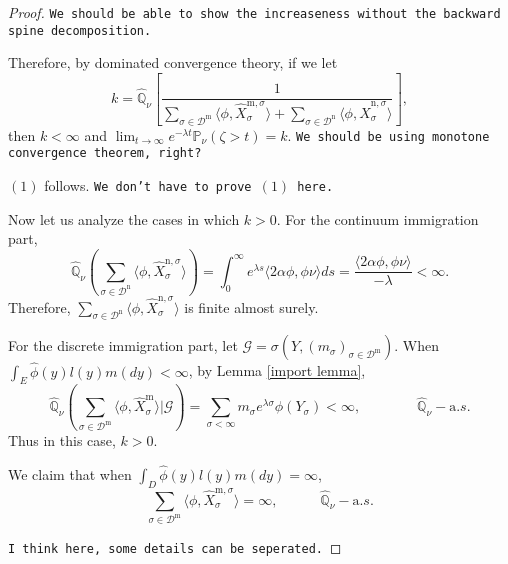 \documentclass[12pt,a4paper]{amsart}
\numberwithin{equation}{section}
\theoremstyle{plain}
\theoremstyle{definition}
\theoremstyle{remark}
\begin{document}
\begin{proof}
	{\tt We should be able to show the increaseness without the backward spine decomposition.}
	
	Therefore, by dominated convergence theory, if we let
	\begin{equation}\label{cons}
	k=\widehat{\mathbb Q}_{\nu}\left[\frac{1}{\sum_{\sigma\in\mathcal D^{\mathrm m}}\langle \phi, \widehat X_{\sigma}^{{\mathrm m},\sigma}\rangle +\sum_{\sigma\in \mathcal D^{\mathrm n}}\langle \phi, \widehat X_{\sigma}^{{\mathrm n},\sigma}\rangle }\right],
	\end{equation}
	then $k<\infty$ and $\lim_{t\to\infty} e^{-\lambda t}\mathbb P_{\nu}(\zeta>t)=k$.  {\tt We should be using monotone convergence theorem, right?}
	
	$(1)$ follows. {\tt We don't have to prove $(1)$ here.}
	
	Now let us analyze the cases in which $k>0$.	For the continuum immigration part,
	\[
	\widehat{\mathbb Q}_{\nu}\left(\sum_{\sigma\in \mathcal D^{\mathrm n}}\langle \phi, \widehat X_{\sigma}^{{\mathrm n},\sigma}\rangle \right)=\int_0^\infty e^{\lambda s}\langle 2\alpha\phi, \phi\nu\rangle  ds=\frac{\langle 2\alpha\phi, \phi\nu\rangle}{-\lambda}<\infty.
	\]
	Therefore, $\sum_{\sigma\in \mathcal D^{\mathrm n}}\langle \phi, \widehat X_{\sigma}^{{\mathrm n},\sigma}\rangle$ is finite almost surely.
	
	For the discrete immigration part, let $\mathcal G=\sigma(Y, ( m_\sigma)_{\sigma\in\mathcal D^{\mathrm m}})$.  When  $\int_E\hat{\phi}(y)l(y)m(dy)<\infty$, by Lemma \ref{import lemma},
	\[
	\widehat{\mathbb Q}_{\nu}\left(\sum_{\sigma\in \mathcal D^{\mathrm m}}\langle \phi, \widehat X_{\sigma}^{{\mathrm m}}\rangle\Big|\mathcal G \right)
	=\sum_{\sigma<\infty}m_\sigma e^{\lambda \sigma}\phi(Y_{\sigma})<\infty,  \qquad\qquad \widehat{\mathbb Q}_{\nu}-{\mathrm a.s.}
	\]
	Thus in this case, $k>0$.
	
	We claim that when $\int_D\hat\phi(y)l(y)m(dy)=\infty$,
	\begin{equation}\label{infty}
	\sum_{\sigma\in \mathcal D^{\mathrm m}}\langle \phi, \widehat X_{\sigma}^{{\mathrm m},\sigma}\rangle =\infty,\quad\qquad  \widehat{\mathbb Q}_\nu-{\mathrm a.s.}
	\end{equation}
	
	{\tt I think here, some details can be seperated.}
	

\end{proof}
\end{document}
